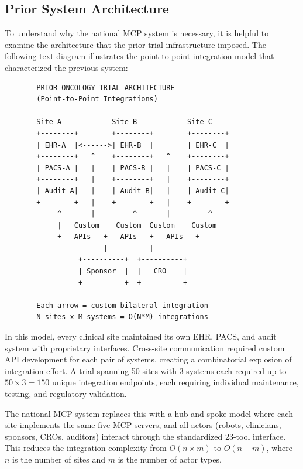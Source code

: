 \documentclass{article}
\begin{document}
\subsection{Prior System Architecture}

To understand why the national MCP system is necessary, it is helpful to examine the architecture that the prior trial infrastructure imposed. The following text diagram illustrates the point-to-point integration model that characterized the previous system:

\begin{figure}[H]
\begin{verbatim}
  PRIOR ONCOLOGY TRIAL ARCHITECTURE
  (Point-to-Point Integrations)

  Site A            Site B            Site C
  +--------+        +--------+        +--------+
  | EHR-A  |<------>| EHR-B  |        | EHR-C  |
  +--------+   ^    +--------+   ^    +--------+
  | PACS-A |   |    | PACS-B |   |    | PACS-C |
  +--------+   |    +--------+   |    +--------+
  | Audit-A|   |    | Audit-B|   |    | Audit-C|
  +--------+   |    +--------+   |    +--------+
       ^       |         ^       |         ^
       |   Custom    Custom  Custom    Custom
       +-- APIs --+-- APIs --+-- APIs --+
                  |          |
            +----------+  +----------+
            | Sponsor  |  |   CRO    |
            +----------+  +----------+

  Each arrow = custom bilateral integration
  N sites x M systems = O(N*M) integrations
\end{verbatim}
\end{figure}

In this model, every clinical site maintained its own EHR, PACS, and audit system with proprietary interfaces. Cross-site communication required custom API development for each pair of systems, creating a combinatorial explosion of integration effort. A trial spanning 50 sites with 3 systems each required up to $50 \times 3 = 150$ unique integration endpoints, each requiring individual maintenance, testing, and regulatory validation.

The national MCP system replaces this with a hub-and-spoke model where each site implements the same five MCP servers, and all actors (robots, clinicians, sponsors, CROs, auditors) interact through the standardized 23-tool interface. This reduces the integration complexity from $O(n \times m)$ to $O(n + m)$, where $n$ is the number of sites and $m$ is the number of actor types.
\end{document}
